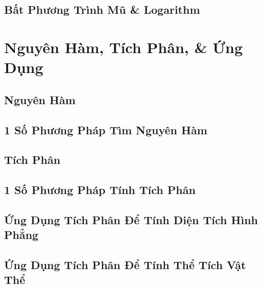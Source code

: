 \documentclass{article}
\numberwithin{equation}{section}
\begin{document}
\subsection{Bất Phương Trình Mũ \& Logarithm}


\section{Nguyên Hàm, Tích Phân, \& Ứng Dụng}

\subsection{Nguyên Hàm}


\subsection{1 Số Phương Pháp Tìm Nguyên Hàm}


\subsection{Tích Phân}


\subsection{1 Số Phương Pháp Tính Tích Phân}


\subsection{Ứng Dụng Tích Phân Để Tính Diện Tích Hình Phẳng}


\subsection{Ứng Dụng Tích Phân Để Tính Thể Tích Vật Thể}
\end{document}
